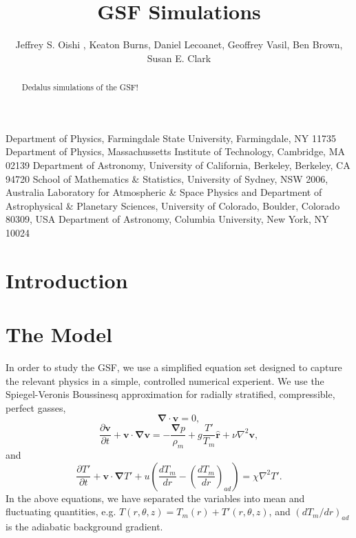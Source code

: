 \documentclass{jfm}
\begin{document}
\newtheorem{lemma}{Lemma}
\newtheorem{corollary}{Corollary}


\title{GSF Simulations}

\author
 {
 Jeffrey S. Oishi
  ,
  Keaton Burns,
  Daniel Lecoanet,
  Geoffrey Vasil,
  Ben Brown,
  Susan E. Clark
  }

\affiliation
{
Department of Physics, Farmingdale State University, Farmingdale, NY 11735
Department of Physics, Massachussetts Institute of Technology, Cambridge, MA 02139
Department of Astronomy, University of California, Berkeley, Berkeley, CA 94720
School of Mathematics \& Statistics, University of Sydney, NSW 2006, Australia
Laboratory for Atmospheric \& Space Physics and Department of Astrophysical \& Planetary Sciences, University of Colorado, Boulder, Colorado 80309, USA
Department of Astronomy, Columbia University, New York, NY 10024

}

\maketitle

\begin{abstract}
Dedalus simulations of the GSF!
\end{abstract}

\section{Introduction}
\label{sec:intro}

\section{The Model}
\label{sec:model}

In order to study the GSF, we use a simplified equation set designed
to capture the relevant physics in a simple, controlled numerical
experient. We use the Spiegel-Veronis Boussinesq approximation for
radially stratified, compressible, perfect gasses,
\begin{equation}
  \label{eq:continuity}
  \mathbf{\nabla \cdot v} = 0,
\end{equation}
\begin{equation}
  \label{eq:momentum}
  \frac{\partial \mathbf{v}}{\partial t} + \mathbf{v \cdot \nabla v} = -\frac{\mathbf{\nabla} p}{\rho_m} + g \frac{T'}{T_m}\mathbf{\hat{r}} + \nu \nabla^2 \mathbf{v},
\end{equation}
and
\begin{equation}
  \label{eq:temp}
  \frac{\partial T'}{\partial t} + \mathbf{v \cdot \nabla} T' + u \left(\frac{d T_m}{dr} - \left(\frac{d T_m}{dr}\right)_{ad}\right) = \chi \nabla^2 T'.
\end{equation}
In the above equations, we have separated the variables into mean and
fluctuating quantities, e.g. $T(r, \theta, z) = T_m(r) + T'(r, \theta, z)$, and $(d T_m/dr)_{ad}$ is the
adiabatic background gradient.
\end{document}
